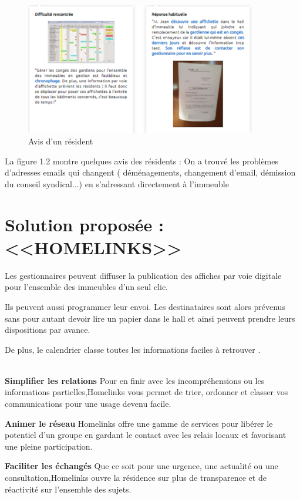 \documentclass[a4paper,10pt]{book}
\begin{document}
  \begin{figure}[!h]
  \centering 
\includegraphics[width=0.9\textwidth]{avis.png}
\caption{ Avis d’un résident}
\label{fig4}
\end{figure}
La figure 1.2 montre quelques avis des résidents \cite{einstein} :
On a trouvé les problèmes d'adresses emails qui changent ( déménagements, changement d'email, démission du conseil syndical...) en s'adressant directement à l'immeuble​
\section{Solution proposée : <<HOMELINKS>>}
 Les gestionnaires peuvent diffuser la publication des affiches par voie digitale pour l’ensemble des immeubles d’un seul clic. 

    Ils peuvent aussi programmer leur envoi. Les destinataires sont alors prévenus sans pour autant devoir lire un papier dans le hall et ainsi peuvent prendre leurs dispositions par avance. 

     De plus, le calendrier classe toutes les informations faciles à retrouver .  
   \\\
\par \textbf{Simplifier les relations }
     Pour en finir avec les incompréhensions ou les informations partielles,Homelinks vous permet de trier, ordonner et classer vos communications pour une usage devenu facile. 
\\
 \par \textbf{Animer le réseau }
     Homelinks \cite{hl} offre une gamme de services pour libérer le potentiel d’un groupe en gardant le contact avec les relais locaux et favorisant  une pleine participation. 
\\
 \par \textbf{Faciliter les échangés }
    Que ce soit pour une urgence, une actualité ou une consultation,Homelinks ouvre la résidence sur plus de transparence et de réactivité sur l’ensemble des sujets.\\\
    
\end{document}
